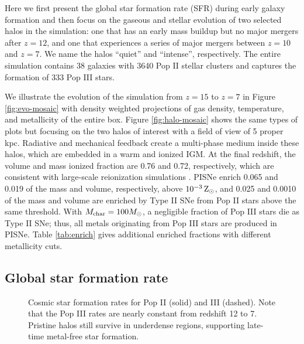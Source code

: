 \documentclass[12pt,preprint]{aastex}
\begin{document}



Here we first present the global star formation rate (SFR) during
early galaxy formation and then focus on the gaseous and stellar
evolution of two selected halos in the simulation: one that has an
early mass buildup but no major mergers after $z=12$, and one that
experiences a series of major mergers between $z=10$ and $z=7$.  We
name the halos ``quiet'' and ``intense'', respectively.  The entire
simulation contains 38 galaxies with 3640 Pop II stellar clusters and
captures the formation of 333 Pop III stars.

We illustrate the evolution of the simulation from $z=15$ to $z=7$ in
Figure \ref{fig:evo-mosaic} with density weighted projections of gas
density, temperature, and metallicity of the entire box.  Figure
\ref{fig:halo-mosaic} shows the same types of plots but focusing on
the two halos of interest with a field of view of 5 proper kpc.
Radiative and mechanical feedback create a multi-phase medium inside
these halos, which are embedded in a warm and ionized IGM.  At the
final redshift, the volume and mass ionized fraction are 0.76 and
0.72, respectively, which are consistent with large-scale reionization
simulations \citep{Zahn11}.  PISNe enrich 0.065 and 0.019 of the mass
and volume, respectively, above $10^{-3} {\rm\,Z_\odot}$, and 0.025 and 0.0010
of the mass and volume are enriched by Type II SNe from Pop II stars
above the same threshold.  With $M_{\rm char} = 100 \Ms$, a negligible
fraction of Pop III stars die as Type II SNe; thus, all metals
originating from Pop III stars are produced in PISNe.  Table
\ref{tab:enrich} gives additional enriched fractions with different
metallicity cuts.

\subsection{Global star formation rate}


\begin{figure}
\caption{\label{fig:sfr} Cosmic star formation rates for Pop II
  (solid) and III (dashed).  Note that the Pop III rates are nearly
  constant from redshift 12 to 7.  Pristine halos still survive in
  underdense regions, supporting late-time metal-free star formation.}
\end{figure}
\end{document}
